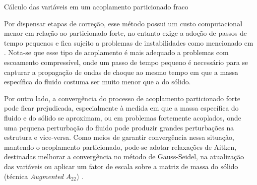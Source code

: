 
\begin{algorithm}[h!]
    \caption{Cálculo das variáveis em um acoplamento particionado fraco}
    \label{alg:PartFraco}



\end{algorithm}

Por dispensar etapas de correção, esse método possui um custo computacional menor em relação ao particionado forte, no entanto exige a adoção de passos de tempo pequenos e fica sujeito a problemas de instabilidades como mencionado em . Nota-se que esse tipo de acoplamento é mais adequado a problemas com escoamento compressível, onde um passo de tempo pequeno é necessário para se capturar a propagação de ondas de choque ao mesmo tempo em que a massa específica do fluido costuma ser muito menor que a do sólido.

Por outro lado, a convergência do processo de acoplamento particionado forte pode ficar prejudicada, especialmente à medida em que a massa específica do fluido e do sólido se aproximam, ou em problemas fortemente acoplados, onde uma pequena perturbação do fluido pode produzir grandes perturbações na estrutura e vice-versa. Como meios de garantir convergência nessa situação, mantendo o acoplamento particionado, pode-se adotar relaxações de Aitken, destinadas melhorar a convergência no método de Gauss-Seidel, na atualização das variáveis \cite{fernandes2019ale} ou aplicar um fator de escala sobre a matriz de massa do sólido (técnica \textit{Augmented $A_{22}$}) \cite{bazilevs2013computational}.